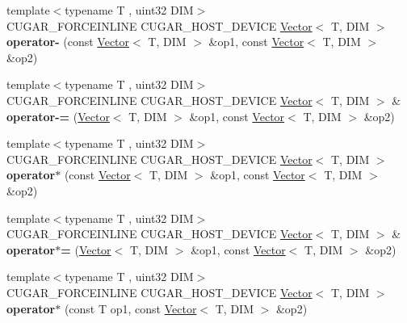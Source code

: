\begin{DoxyCompactItemize}
\item 
\mbox{\label{namespacecugar_a1c38abc27b9519b693d846544e32b58c}} 
{\footnotesize template$<$typename T , uint32 D\+IM$>$ }\\C\+U\+G\+A\+R\+\_\+\+F\+O\+R\+C\+E\+I\+N\+L\+I\+NE C\+U\+G\+A\+R\+\_\+\+H\+O\+S\+T\+\_\+\+D\+E\+V\+I\+CE \hyperlink{structcugar_1_1_vector}{Vector}$<$ T, D\+IM $>$ {\bfseries operator-\/} (const \hyperlink{structcugar_1_1_vector}{Vector}$<$ T, D\+IM $>$ \&op1, const \hyperlink{structcugar_1_1_vector}{Vector}$<$ T, D\+IM $>$ \&op2)
\item 
\mbox{\label{namespacecugar_a5ad9e3408a4129080cfa4bddcdf011b7}} 
{\footnotesize template$<$typename T , uint32 D\+IM$>$ }\\C\+U\+G\+A\+R\+\_\+\+F\+O\+R\+C\+E\+I\+N\+L\+I\+NE C\+U\+G\+A\+R\+\_\+\+H\+O\+S\+T\+\_\+\+D\+E\+V\+I\+CE \hyperlink{structcugar_1_1_vector}{Vector}$<$ T, D\+IM $>$ \& {\bfseries operator-\/=} (\hyperlink{structcugar_1_1_vector}{Vector}$<$ T, D\+IM $>$ \&op1, const \hyperlink{structcugar_1_1_vector}{Vector}$<$ T, D\+IM $>$ \&op2)
\item 
\mbox{\label{namespacecugar_ab5dec3d6b28a7604b9a77c807bdbb314}} 
{\footnotesize template$<$typename T , uint32 D\+IM$>$ }\\C\+U\+G\+A\+R\+\_\+\+F\+O\+R\+C\+E\+I\+N\+L\+I\+NE C\+U\+G\+A\+R\+\_\+\+H\+O\+S\+T\+\_\+\+D\+E\+V\+I\+CE \hyperlink{structcugar_1_1_vector}{Vector}$<$ T, D\+IM $>$ {\bfseries operator$\ast$} (const \hyperlink{structcugar_1_1_vector}{Vector}$<$ T, D\+IM $>$ \&op1, const \hyperlink{structcugar_1_1_vector}{Vector}$<$ T, D\+IM $>$ \&op2)
\item 
\mbox{\label{namespacecugar_a5ae4468a0c206314b74bb9948301d192}} 
{\footnotesize template$<$typename T , uint32 D\+IM$>$ }\\C\+U\+G\+A\+R\+\_\+\+F\+O\+R\+C\+E\+I\+N\+L\+I\+NE C\+U\+G\+A\+R\+\_\+\+H\+O\+S\+T\+\_\+\+D\+E\+V\+I\+CE \hyperlink{structcugar_1_1_vector}{Vector}$<$ T, D\+IM $>$ \& {\bfseries operator$\ast$=} (\hyperlink{structcugar_1_1_vector}{Vector}$<$ T, D\+IM $>$ \&op1, const \hyperlink{structcugar_1_1_vector}{Vector}$<$ T, D\+IM $>$ \&op2)
\item 
\mbox{\label{namespacecugar_ad5fa30ab7f7720b0dd5c091fc6b7996a}} 
{\footnotesize template$<$typename T , uint32 D\+IM$>$ }\\C\+U\+G\+A\+R\+\_\+\+F\+O\+R\+C\+E\+I\+N\+L\+I\+NE C\+U\+G\+A\+R\+\_\+\+H\+O\+S\+T\+\_\+\+D\+E\+V\+I\+CE \hyperlink{structcugar_1_1_vector}{Vector}$<$ T, D\+IM $>$ {\bfseries operator$\ast$} (const T op1, const \hyperlink{structcugar_1_1_vector}{Vector}$<$ T, D\+IM $>$ \&op2)

\end{DoxyCompactItemize}
